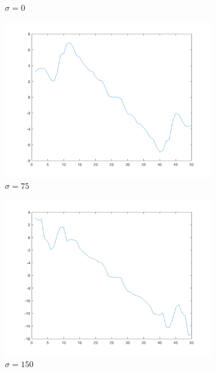 \begin{figure}[htpb]
\begin{subfigure}{.25\textwidth}
\caption{$\sigma = 0$}
\end{subfigure}%
\begin{subfigure}{.25\textwidth}
\includegraphics[width=1\textwidth]{img/ProjYPCsigma75}
\caption{$\sigma = 75$}
\end{subfigure}%
\begin{subfigure}{.25\textwidth}
\includegraphics[width=1\textwidth]{img/ProjYPCsigma150}
\caption{$\sigma = 150$}
\end{subfigure}%
\begin{subfigure}{.25\textwidth}

\end{subfigure}
\end{figure}
